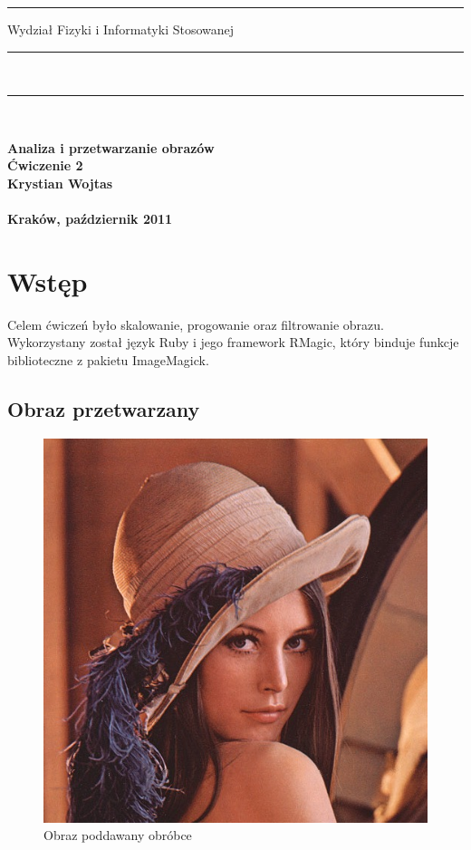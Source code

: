 \documentclass[a4paper,12pt]{article}
\begin{document}
\rule{26mm}{0pt}
{\large\textsf{Wydział Fizyki i Informatyki Stosowanej}}\\
\rule{\textwidth}{3pt}\\
\rule[2ex]
{\textwidth}{1pt}\\
\vspace{7ex}
\begin{center}
{\bf\LARGE\textsf{Analiza i przetwarzanie obrazów}}\\
\vspace{13ex}
{\bf\huge\textsf{Ćwiczenie 2}}\\
\vspace{3ex}
{\sf \small } {\bf\small\textsf{Krystian Wojtas}}\\
\vspace{14ex}
{\sf \Large } {\bf\Large\textsf{}}\\
\vspace{22ex}
\textsf{\bf\large\textsf{Kraków, październik 2011}}
\end{center}


\newpage
\section{Wstęp}
Celem ćwiczeń było skalowanie, progowanie oraz filtrowanie obrazu. Wykorzystany został język Ruby i jego framework RMagic, który binduje funkcje biblioteczne z pakietu ImageMagick.

\subsection{Obraz przetwarzany}
\begin{figure}[h!]
   \centering
   \includegraphics[width=15cm]{../../lena.jpg}
   \caption{Obraz poddawany obróbce}
\end{figure}
\end{document}
